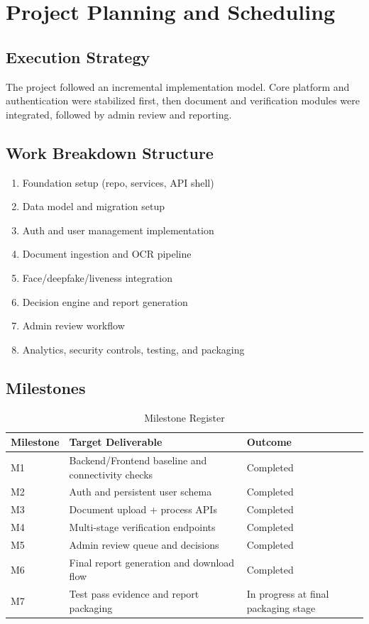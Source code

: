 \chapter{Project Planning and Scheduling}

\section{Execution Strategy}
The project followed an incremental implementation model. Core platform and authentication were stabilized first, then document and verification modules were integrated, followed by admin review and reporting.

\section{Work Breakdown Structure}
\begin{enumerate}
\item Foundation setup (repo, services, API shell)
\item Data model and migration setup
\item Auth and user management implementation
\item Document ingestion and OCR pipeline
\item Face/deepfake/liveness integration
\item Decision engine and report generation
\item Admin review workflow
\item Analytics, security controls, testing, and packaging
\end{enumerate}

\section{Milestones}
\begin{longtable}{p{2.2cm}p{6.5cm}p{5.8cm}}
\caption{Milestone Register}\\
\toprule
Milestone & Target Deliverable & Outcome \\
\midrule
M1 & Backend/Frontend baseline and connectivity checks & Completed \\
M2 & Auth and persistent user schema & Completed \\
M3 & Document upload + process APIs & Completed \\
M4 & Multi-stage verification endpoints & Completed \\
M5 & Admin review queue and decisions & Completed \\
M6 & Final report generation and download flow & Completed \\
M7 & Test pass evidence and report packaging & In progress at final packaging stage \\
\bottomrule
\end{longtable}

